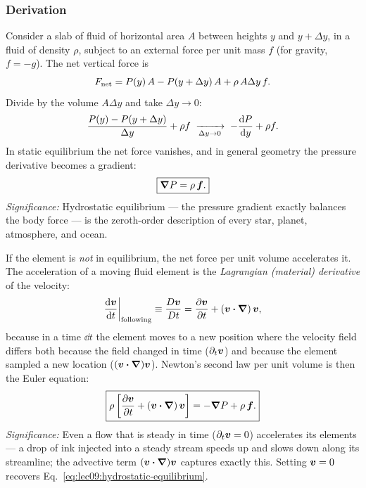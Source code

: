 \subsubsection*{Derivation}
Consider a slab of fluid of horizontal area $A$ between heights $y$ and
$y+\Delta y$, in a fluid of density $\rho$, subject to an external force per
unit mass $f$ (for gravity, $f=-g$). The net vertical force is
\begin{equation}
    F_{\rm net}
    =
    P(y)\,A-P(y+\Delta y)\,A+\rho\,A\Delta y\,f.
    \label{eq:lec09:slab-forces}
\end{equation}
Divide by the volume $A\Delta y$ and take $\Delta y\to0$:
\begin{equation}
    \frac{P(y)-P(y+\Delta y)}{\Delta y}+\rho f
    \;\xrightarrow[\Delta y\to0]{}\;
    -\dv{P}{y}+\rho f.
    \label{eq:lec09:slab-limit}
\end{equation}
In static equilibrium the net force vanishes, and in general geometry the
pressure derivative becomes a gradient:
\begin{equation}
    \boxed{
    \grad P=\rho\,\vb*{f}.
    }
    \label{eq:lec09:hydrostatic-equilibrium}
\end{equation}
\textit{Significance:} Hydrostatic equilibrium --- the pressure gradient
exactly balances the body force --- is the zeroth-order description of every
star, planet, atmosphere, and ocean.

If the element is \emph{not} in equilibrium, the net force per unit volume
accelerates it. The acceleration of a moving fluid element is the
\emph{Lagrangian (material) derivative} of the velocity:
\begin{equation}
    \dv{\vb*{v}}{t}\bigg|_{\rm following}
    \equiv
    \frac{D\vb*{v}}{Dt}
    =
    \pdv{\vb*{v}}{t}
    +\left(\vb*{v}\vdot\grad\right)\vb*{v},
    \label{eq:lec09:material-derivative}
\end{equation}
because in a time $\dd t$ the element moves to a new position where the
velocity field differs both because the field changed in time
($\partial_t\vb*{v}$) and because the element sampled a new location
($(\vb*{v}\vdot\grad)\vb*{v}$). Newton's second law per unit volume is then
the Euler equation:
\begin{equation}
    \boxed{
    \rho\left[
    \pdv{\vb*{v}}{t}
    +\left(\vb*{v}\vdot\grad\right)\vb*{v}
    \right]
    =
    -\grad P+\rho\,\vb*{f}.
    }
    \label{eq:lec09:euler-equation}
\end{equation}
\textit{Significance:} Even a flow that is steady in time
($\partial_t\vb*{v}=0$) accelerates its elements --- a drop of ink injected
into a steady stream speeds up and slows down along its streamline; the
advective term $(\vb*{v}\vdot\grad)\vb*{v}$ captures exactly this. Setting
$\vb*{v}=0$ recovers Eq.~\eqref{eq:lec09:hydrostatic-equilibrium}.

